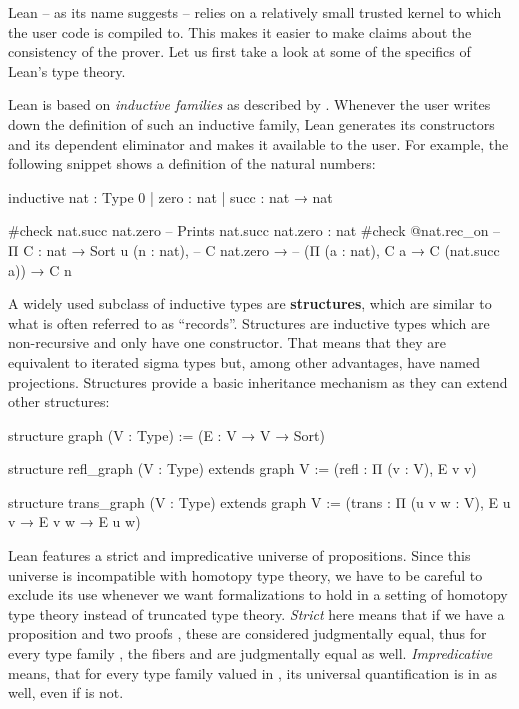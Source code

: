 Lean -- as its name suggests -- relies on a relatively small trusted kernel to which
the user code is compiled to.
This makes it easier to make claims about the consistency of the prover.
Let us first take a look at some of the specifics of Lean's type theory.

Lean is based on \emph{inductive families} as described by \citet{dybjer94}.
Whenever the user writes down the definition of such an inductive family,
Lean generates its constructors and its dependent eliminator and makes
it available to the user.
For example, the following snippet shows a definition of the natural numbers:
\begin{leancodebr}
inductive nat : Type 0
| zero : nat
| succ : nat → nat

#check nat.succ nat.zero -- Prints nat.succ nat.zero : nat
#check @nat.rec_on -- Π {C : nat → Sort u} (n : nat),
                   --   C nat.zero →
                   --   (Π (a : nat), C a → C (nat.succ a)) → C n
\end{leancodebr}

A widely used subclass of inductive types are \textbf{structures}, which are
similar to what is often referred to as ``records''.
Structures are inductive types which are non-recursive and only have one constructor.
That means that they are equivalent to iterated sigma types but, among other advantages,
have named projections.
Structures provide a basic inheritance mechanism as they can extend other structures:
\begin{leancode}
structure graph (V : Type) :=
  (E : V → V → Sort)

structure refl_graph (V : Type) extends graph V :=
  (refl : Π (v : V), E v v)

structure trans_graph (V : Type) extends graph V :=
  (trans : Π (u v w : V), E u v → E v w → E u w)
\end{leancode}

Lean features a strict and impredicative universe  of propositions.
Since this universe is incompatible with homotopy type theory, we have to be
careful to exclude its use whenever we want formalizations to hold in
a setting of homotopy type theory instead of truncated type theory.
\emph{Strict} here means that if we have a proposition  and two
proofs , these are considered judgmentally equal, thus for
every type family , the fibers  and 
are judgmentally equal as well.
\emph{Impredicative} means, that for every type family valued in ,
its universal quantification  is in  as well, even
if  is not.

